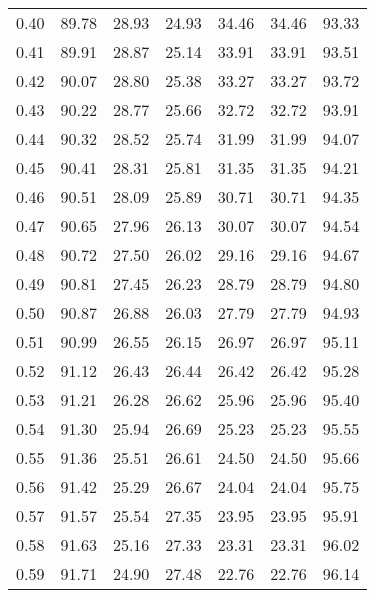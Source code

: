 \begin{tabular}{|c|c|c|c|c|c|c|}
      0.40 &     89.78 &     28.93 &      24.93 &   34.46 &      34.46 &         93.33 \\
      0.41 &     89.91 &     28.87 &      25.14 &   33.91 &      33.91 &         93.51 \\
      0.42 &     90.07 &     28.80 &      25.38 &   33.27 &      33.27 &         93.72 \\
      0.43 &     90.22 &     28.77 &      25.66 &   32.72 &      32.72 &         93.91 \\
      0.44 &     90.32 &     28.52 &      25.74 &   31.99 &      31.99 &         94.07 \\
      0.45 &     90.41 &     28.31 &      25.81 &   31.35 &      31.35 &         94.21 \\
      0.46 &     90.51 &     28.09 &      25.89 &   30.71 &      30.71 &         94.35 \\
      0.47 &     90.65 &     27.96 &      26.13 &   30.07 &      30.07 &         94.54 \\
      0.48 &     90.72 &     27.50 &      26.02 &   29.16 &      29.16 &         94.67 \\
      0.49 &     90.81 &     27.45 &      26.23 &   28.79 &      28.79 &         94.80 \\
      0.50 &     90.87 &     26.88 &      26.03 &   27.79 &      27.79 &         94.93 \\
      0.51 &     90.99 &     26.55 &      26.15 &   26.97 &      26.97 &         95.11 \\
      0.52 &     91.12 &     26.43 &      26.44 &   26.42 &      26.42 &         95.28 \\
      0.53 &     91.21 &     26.28 &      26.62 &   25.96 &      25.96 &         95.40 \\
      0.54 &     91.30 &     25.94 &      26.69 &   25.23 &      25.23 &         95.55 \\
      0.55 &     91.36 &     25.51 &      26.61 &   24.50 &      24.50 &         95.66 \\
      0.56 &     91.42 &     25.29 &      26.67 &   24.04 &      24.04 &         95.75 \\
      0.57 &     91.57 &     25.54 &      27.35 &   23.95 &      23.95 &         95.91 \\
      0.58 &     91.63 &     25.16 &      27.33 &   23.31 &      23.31 &         96.02 \\
      0.59 &     91.71 &     24.90 &      27.48 &   22.76 &      22.76 &         96.14 \\

\end{tabular}

